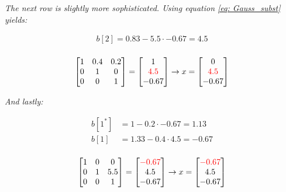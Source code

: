 \textit{The next row is slightly more sophisticated. Using equation \ref{eq: Gauss_subst} yields:}

\begin{align*}
    b[2] = 0.83 - 5.5 \cdot -0.67 = 4.5\\
\end{align*}

\begin{align*}
    \begin{bmatrix}
        1 & 0.4 & 0.2 \\
        0 & 1 & 0 \\
        0 & 0 & 1 \\
    \end{bmatrix}
    =
    \begin{bmatrix}
        1 \\
        \color{red}4.5 \\
        -0.67 \\
    \end{bmatrix}
    \rightarrow
    x =
    \begin{bmatrix}
        0 \\
        \color{red}4.5 \\
        -0.67 \\
    \end{bmatrix}
\end{align*}

\textit{And lastly:}

\begin{align*}
    b[1^\ast] &= 1 - 0.2 \cdot -0.67 = 1.13 \\
    b[1] &= 1.33 - 0.4 \cdot 4.5 = -0.67 \\
\end{align*}

\begin{align*}
    \begin{bmatrix}
        1 & 0 & 0 \\
        0 & 1 & 5.5 \\
        0 & 0 & 1 \\
    \end{bmatrix}
    =
    \begin{bmatrix}
        \color{red}-0.67 \\
        4.5 \\
        -0.67 \\
    \end{bmatrix}
    \rightarrow
    x =
    \begin{bmatrix}
        \color{red}-0.67 \\
        4.5 \\
        -0.67 \\
    \end{bmatrix}
\end{align*}